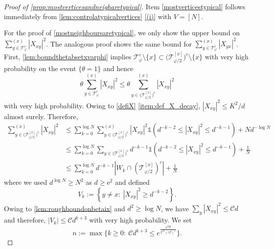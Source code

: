 \documentclass[10pt,a4paper]{amsart}
\newcommand{\ee}{\mathrm{e}}
\newcommand{\abs}[1]{\left| #1 \right|}
\numberwithin{equation}{section}
\newcommand*\bset[1]{[#1]}
\begin{document}
	\begin{proof}[Proof of \cref{prop:mostverticesandneigharetypical}]
		Item \cref{mostverticestypical} follows immediately from  \cref{lem:controlatypicalvertices} \cref{(i)} with $V= [N]$.
		
		For the proof of  \cref{mostneighboursaretypical}, we only show  
	 the upper bound on $\sum_{y\in \mathcal{T}^c_{\varphi}}^{(x)} \abs{X_{xy}}^2$. The analogous proof shows the same bound for $\sum_{y\in \mathcal{T}^c_{\varphi}}^{(x)} \abs{X_{yx}}^2$. First, \cref{lem:boundthetabsetxvarphi} implies $\mathcal{T}_{\varphi}^c  \setminus \{ x\}  \subset \big(\mathcal{T}^{\bset{x}}_{\varphi/2}\big)^c \setminus \{ x\}  $ with very high probability on the event $\{\theta =1 \}$ and hence
		\begin{equation*}
			\theta \sum_{y \in \mathcal{T}_{\varphi}^c}^{(x)} \abs{X_{xy}}^2 \le \theta \sum_{y \in \big(\mathcal{T}^{\bset{x}}_{\varphi/2}\big)^c }^{(x)} \abs{X_{xy}}^2
		\end{equation*}
		with very high probability. Owing to \cref{defiX} \cref{item:def_X_decay}, $\abs{X_{xy}}^2\le K^2/d $ almost surely. Therefore, 
		\begin{align*}
			\sum_{y \in \big(\mathcal{T}^{\bset{x}}_{\varphi/2}\big)^c }^{(x)} \abs{X_{xy}}^2 &\le \sum_{k=0}^{\log N }\sum_{y \in \big(\mathcal{T}^{\bset{x}}_{\varphi/2}\big)^c }^{(x)} \abs{X_{xy}}^2 \mathds{1}\left( d^{-k-2}\le \abs{X_{xy}}^2 \le d^{-k-1}\right) + Nd^{-\log N }\\
			&\le \sum_{k=0}^{\log N}\sum_{y \in \big(\mathcal{T}^{\bset{x}}_{\varphi/2}\big)^c } d^{-k-1} \mathds{1}\left( d^{-k-2}\le \abs{X_{xy}}^2 \le d^{-k-1}\right) + \frac{1}{N}\\
			&\le  \sum_{k=0}^{\log N } d^{-k-1}\abs{W_k \cap\left(\mathcal{T}^{\bset{x}}_{\varphi/2}\right)^c}  + \frac{1}{N}
		\end{align*}
		where we used $d^{\log N } \ge N^2$ as $d \geq \ee^2$ and defined 
		\begin{equation*}
			V_k := \left\{ y \neq x:~ \abs{X_{xy}}^2\ge d^{-k-2}\right\}.
		\end{equation*}
		Owing to \cref{lem:roughboundonbetaix} and $d^2 \geq \log N$,  we have   $ \sum_{y } \abs{X_{xy}}^2  \le \mathcal{C}d$ and therefore, $\abs{V_{k}}\le \mathcal{C}d^{k+3}$ with very high probability. We set 
		\begin{equation*}
		n:= \max \biggl\{ k \ge 0:~ \mathcal{C}d^{k+3} \le e^{\frac{\varphi^2d}{2^{13} (e\Gamma)^2}} \biggr\}. 
			\end{equation*}

\end{proof}
\end{document}
